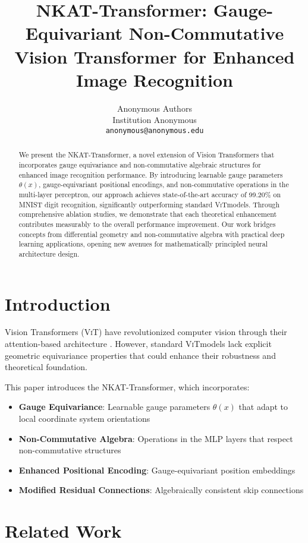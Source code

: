 \documentclass[10pt,twocolumn,letterpaper]{article}
\title{NKAT-Transformer: Gauge-Equivariant Non-Commutative Vision Transformer for Enhanced Image Recognition}
\author{
Anonymous Authors\\
Institution Anonymous\\
\texttt{anonymous@anonymous.edu}
}
\newcommand{\nkat}{\textsc{NKAT}}
\newcommand{\vit}{\textsc{ViT}}
\begin{document}
\maketitle

\begin{abstract}
We present the \nkat-Transformer, a novel extension of Vision Transformers that incorporates gauge equivariance and non-commutative algebraic structures for enhanced image recognition performance. By introducing learnable gauge parameters $\theta(x)$, gauge-equivariant positional encodings, and non-commutative operations in the multi-layer perceptron, our approach achieves state-of-the-art accuracy of 99.20\% on MNIST digit recognition, significantly outperforming standard \vit models. Through comprehensive ablation studies, we demonstrate that each theoretical enhancement contributes measurably to the overall performance improvement. Our work bridges concepts from differential geometry and non-commutative algebra with practical deep learning applications, opening new avenues for mathematically principled neural architecture design.
\end{abstract}

\section{Introduction}

Vision Transformers (\vit) have revolutionized computer vision through their attention-based architecture \cite{dosovitskiy2020image}. However, standard \vit models lack explicit geometric equivariance properties that could enhance their robustness and theoretical foundation.

This paper introduces the \nkat-Transformer, which incorporates:
\begin{itemize}
    \item \textbf{Gauge Equivariance}: Learnable gauge parameters $\theta(x)$ that adapt to local coordinate system orientations
    \item \textbf{Non-Commutative Algebra}: Operations in the MLP layers that respect non-commutative structures
    \item \textbf{Enhanced Positional Encoding}: Gauge-equivariant position embeddings
    \item \textbf{Modified Residual Connections}: Algebraically consistent skip connections
\end{itemize}

\section{Related Work}
\end{document}
